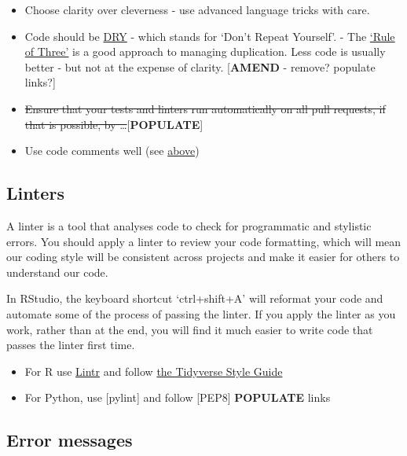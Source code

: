 \documentclass[]{book}
\providecommand{\tightlist}{%
  \setlength{\itemsep}{0pt}\setlength{\parskip}{0pt}}
\begin{document}
\begin{itemize}
\tightlist
\item
  Choose clarity over cleverness - use advanced language tricks with care.
\item
  Code should be \href{https://en.wikipedia.org/wiki/Don\%27t_repeat_yourself}{DRY} - which stands for `Don't Repeat Yourself'. - The \href{https://en.wikipedia.org/wiki/Rule_of_three_(computer_programming)}{`Rule of Three'} is a good approach to managing duplication. Less code is usually better - but not at the expense of clarity. {[}\textbf{AMEND} - remove? populate links?{]}
\item
  \sout{Ensure that your tests and linters run automatically on all pull requests, if that is possible, by \ldots{}}{[}\textbf{POPULATE}{]}
\item
  Use code comments well (see \protect\hyperlink{readme}{above})
\end{itemize}

\hypertarget{linter}{%
\subsection*{Linters}\label{linter}}

A linter is a tool that analyses code to check for programmatic and stylistic errors. You should apply a linter to review your code formatting, which will mean our coding style will be consistent across projects and make it easier for others to understand our code.

In RStudio, the keyboard shortcut `ctrl+shift+A' will reformat your code and automate some of the process of passing the linter. If you apply the linter as you work, rather than at the end, you will find it much easier to write code that passes the linter first time.

\begin{itemize}
\tightlist
\item
  For R use \href{https://cran.r-project.org/web/packages/lintr/readme/README.html}{Lintr} and follow \href{https://style.tidyverse.org/index.html}{the Tidyverse Style Guide}\\
\item
  For Python, use {[}pylint{]} and follow {[}PEP8{]} \textbf{POPULATE} links
\end{itemize}

\hypertarget{errors}{%
\subsection*{Error messages}\label{errors}}
\end{document}
